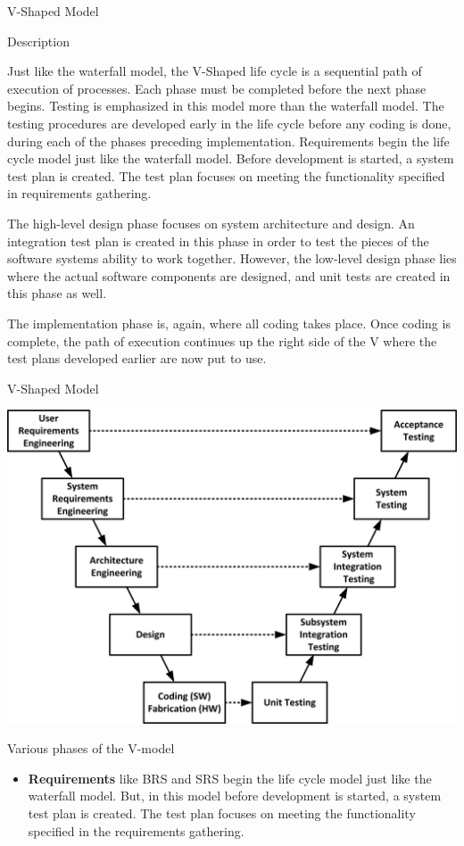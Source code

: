 \documentclass[final,hyperref={pdfpagelabels=false}]{beamer}
\begin{document}
  \begin{frame}{V-Shaped Model}
        \begin{block}{\large Description}
            
            Just like the waterfall model, the V-Shaped life cycle is a
            sequential path of execution of processes. Each phase
            must be completed before the next phase begins. Testing
            is emphasized in this model more than the waterfall
            model. The testing procedures are developed early in the
            life cycle before any coding is done, during each of the
            phases preceding implementation. Requirements begin the
            life cycle model just like the waterfall model. Before
            development is started, a system test plan is created. The
            test plan focuses on meeting the functionality specified in
            requirements gathering.
            
            The high-level design phase focuses on system
            architecture and design. An integration test plan is created
            in this phase in order to test the pieces of the software
            systems ability to work together. However, the low-level
            design phase lies where the actual software components
            are designed, and unit tests are created in this phase as
            well.
            
            The implementation phase is, again, where all coding
            takes place. Once coding is complete, the path of
            execution continues up the right side of the V where the
            test plans developed earlier are now put to use.
        \end{block}
    \begin{block}{\large V-Shaped Model}
      \centering
      
        \includegraphics[width=.5\linewidth]{V}
       
    \end{block}
    \begin{block}{\large Various phases of the V-model }
        \centering
        \begin{itemize}
            \item \textbf{ Requirements} like BRS and SRS begin the life cycle model just like the waterfall model. But, in this model before development is started, a system test plan is created.  The test plan focuses on meeting the functionality specified in the requirements gathering.


\end{itemize}
\end{block}
\end{frame}
\end{document}
